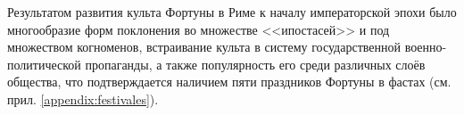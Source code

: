 Результатом развития культа Фортуны в Риме к началу императорской эпохи было многообразие форм поклонения во множестве <<ипостасей>> и под множеством когноменов, встраивание культа в систему государственной военно-политической пропаганды, а также популярность его среди различных слоёв общества, что подтверждается наличием пяти праздников Фортуны в фастах (см. прил. \ref{appendix:festivales}).


